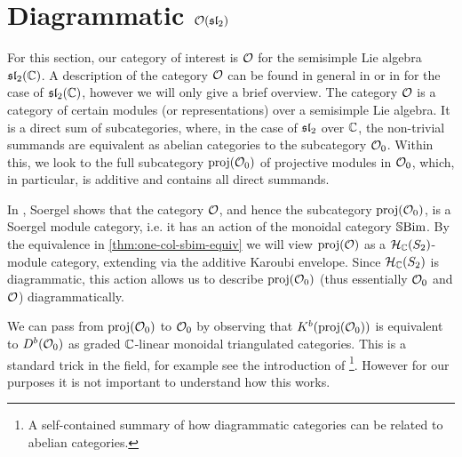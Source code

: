\section{Diagrammatic $\mathcal{O}(\operatorname{\mathfrak{sl}}_2)$}
\label{sec:3.2}


For this section, our category of interest is $\mathcal{O}$ for the semisimple Lie algebra $\operatorname{\mathfrak{sl}}_2(\mathbb{C})$. A description of the category $\mathcal{O}$ can be found in general in {\cite[Sections 3.8--3.10]{humphreys-category-O}} or in {\cite[Section 5.2]{mazorchuk-lectures-sl2-modules}} for the case of $\operatorname{\mathfrak{sl}}_2(\mathbb{C})$, however we will only give a brief overview. The category $\mathcal{O}$ is a category of certain modules (or representations) over a semisimple Lie algebra. It is a direct sum of subcategories, where, in the case of $\operatorname{\mathfrak{sl}}_2$ over $\mathbb{C}$, the non-trivial summands are equivalent as abelian categories to the subcategory $\mathcal{O}_0$. Within this, we look to the full subcategory $\operatorname{proj}(\mathcal{O}_0)$ of projective modules in $\mathcal{O}_0$, which, in particular, is additive and contains all direct summands.

In \cite[Section 2.4]{soergel-category-O}, Soergel shows that the category $\mathcal{O}$, and hence the subcategory $\operatorname{proj}(\mathcal{O}_0)$, is a Soergel module category, i.e. it has an action of the monoidal category $\operatorname{\mathbb{S}Bim}$. By the equivalence in \autoref{thm:one-col-sbim-equiv} we will view $\operatorname{proj}(\mathcal{O})$ as a $\mathcal{H}_{\mathbb{C}}(S_2)$-module category, extending via the additive Karoubi envelope. Since $\mathcal{H}_{\mathbb{C}}(S_2)$ is diagrammatic, this action allows us to describe $\operatorname{proj}(\mathcal{O}_0)$ (thus essentially $\mathcal{O}_0$ and $\mathcal{O}$) diagrammatically.

\begin{remark}
    \label{rk:projO_0-to-O_0}
    We can pass from $\operatorname{proj}(\mathcal{O}_0)$ to $\mathcal{O}_0$ by observing that $K^b(\operatorname{proj}(\mathcal{O}_0))$ is equivalent to $D^b(\mathcal{O}_0)$ as graded $\mathbb{C}$-linear monoidal triangulated categories. This is a standard trick in the field, for example see the introduction of \cite{riche-williamson-tilt-modules-p-canon-basis}\footnote{A self-contained summary of how diagrammatic categories can be related to abelian categories.}. However for our purposes it is not important to understand how this works.
\end{remark}


